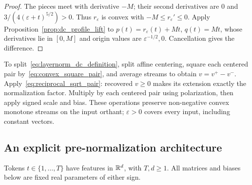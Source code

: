 \begin{proof}
The pieces meet with derivative $-M$; their second derivatives are $0$ and $3/(4(\varepsilon+t)^{5/2})>0$. Thus $r_\varepsilon$ is convex with $-M\le r_\varepsilon'\le0$. Apply Proposition~\ref{prop:dc_profile_lift} to $p(t)=r_\varepsilon(t)+Mt$, $q(t)=Mt$, whose derivatives lie in $[0,M]$ and origin values are $\varepsilon^{-1/2},0$. Cancellation gives the difference.
\end{proof}

To split~\eqref{eq:layernorm_dc_definition}, split affine centering, square each centered pair by~\eqref{eq:convex_square_pair}, and average streams to obtain $v=v^+-v^-$. Apply~\eqref{eq:reciprocal_sqrt_pair}: recovered $v\ge0$ makes its extension exactly the normalization factor. Multiply by each centered pair using polarization, then apply signed scale and bias. These operations preserve non-negative convex monotone streams on the input orthant; $\varepsilon>0$ covers every input, including constant vectors.

\subsection{An explicit pre-normalization architecture}

Tokens $t\in\{1,\dots,T\}$ have features in $\mathbb{R}^d$, with $T,d\ge1$. All matrices and biases below are fixed real parameters of either sign.

